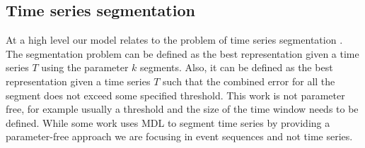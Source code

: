 \subsection{Time series segmentation}
At a high level our model relates to the problem of time series segmentation 
\cite{Keogh:2001,Karras:2007,Guo:multi}. 
The segmentation problem can be defined as the best representation given a time series $T$ using the parameter $k$ segments. 
Also, it can be defined as the best representation given a time series $T$ such that the combined error for all the segment does not exceed some specified threshold. This work is not parameter free, for example usually a threshold and the size of the time window needs to be defined.  While some work uses MDL to segment time series by providing a parameter-free approach \cite{xu:2013,Hu2015} we are focusing in event sequences and not time series. 

